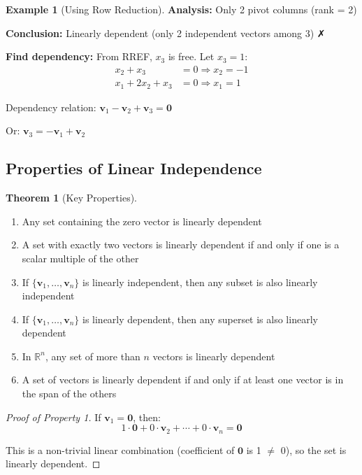 \documentclass[12pt,a4paper]{article}
\theoremstyle{definition}
\newtheorem{theorem}{Theorem}[section]
\newtheorem{example}{Example}[section]
\begin{document}
\begin{example}[Using Row Reduction]
\textbf{Analysis:} Only 2 pivot columns (rank = 2)

\textbf{Conclusion:} Linearly dependent (only 2 independent vectors among 3) ✗

\textbf{Find dependency:} From RREF, $x_3$ is free. Let $x_3 = 1$:
\begin{align}
x_2 + x_3 &= 0 \Rightarrow x_2 = -1 \\
x_1 + 2x_2 + x_3 &= 0 \Rightarrow x_1 = 1
\end{align}

Dependency relation: $\mathbf{v}_1 - \mathbf{v}_2 + \mathbf{v}_3 = \mathbf{0}$

Or: $\mathbf{v}_3 = -\mathbf{v}_1 + \mathbf{v}_2$
\end{example}

\subsection{Properties of Linear Independence}

\begin{theorem}[Key Properties]
\begin{enumerate}
    \item Any set containing the zero vector is linearly dependent
    
    \item A set with exactly two vectors is linearly dependent if and only if one is a scalar multiple of the other
    
    \item If $\{\mathbf{v}_1, \ldots, \mathbf{v}_n\}$ is linearly independent, then any subset is also linearly independent
    
    \item If $\{\mathbf{v}_1, \ldots, \mathbf{v}_n\}$ is linearly dependent, then any superset is also linearly dependent
    
    \item In $\mathbb{R}^n$, any set of more than $n$ vectors is linearly dependent
    
    \item A set of vectors is linearly dependent if and only if at least one vector is in the span of the others
\end{enumerate}
\end{theorem}

\begin{proof}[Proof of Property 1]
If $\mathbf{v}_1 = \mathbf{0}$, then:
\begin{equation}
1 \cdot \mathbf{0} + 0 \cdot \mathbf{v}_2 + \cdots + 0 \cdot \mathbf{v}_n = \mathbf{0}
\end{equation}

This is a non-trivial linear combination (coefficient of $\mathbf{0}$ is 1 $\neq$ 0), so the set is linearly dependent.
\end{proof}
\end{document}
